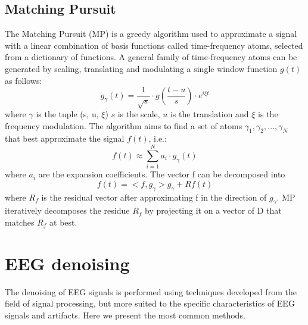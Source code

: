 \documentclass[a4paper, noexaminfo]{sapthesis}
\begin{document}
\subsection{Matching Pursuit}\label{sec:mp}
The Matching Pursuit (MP)\cite{mp} is a greedy algorithm used to approximate a
signal with a linear combination of basis functions called time-frequency 
atoms, selected from a dictionary of functions. \newline
A general family of time-frequency atoms can be generated by scaling, translating 
and modulating a single window function $g(t)$ as follows:
\begin{equation}
\label{eq:mp}
g_{\gamma}(t) = \frac{1}{\sqrt{s}} \cdot g(\frac{t-u}{s}) \cdot e^{i\xi t}
\end{equation}
where $\gamma$ is the tuple (s, u, $\xi$) $s$ is the scale, $u$ is the
translation and $\xi$ is the frequency modulation. \newline
The algorithm aims to find a set of atoms $\gamma_1, \gamma_2, \dots, \gamma_N$
that best approximate the signal $f(t)$, i.e.:
\begin{equation}
\label{eq:mp2}
f(t) \approx \sum_{i=1}^{N} a_i \cdot g_{\gamma}(t)
\end{equation}
where $a_i$ are the expansion coefficients. \newline
The vector f can be decomposed into 
\begin{equation}
\label{eq:mp3}
f(t) = <f, g_{\gamma}>g_{\gamma} + Rf(t)
\end{equation}
where $R_{f}$ is the residual vector after approximating f in the direction
 of $g_{\gamma}$. \newline
MP iteratively decomposes the residue $R_{f}$  by projecting it on a vector
of D that matches $R_{f}$ at best. \newline
\section{EEG denoising}\label{sec:denoising}
The denoising of EEG signals is performed using techniques developed from
the field of signal processing, but more suited to the specific characteristics
of EEG signals and artifacts. Here we present the most common methods.
\end{document}
